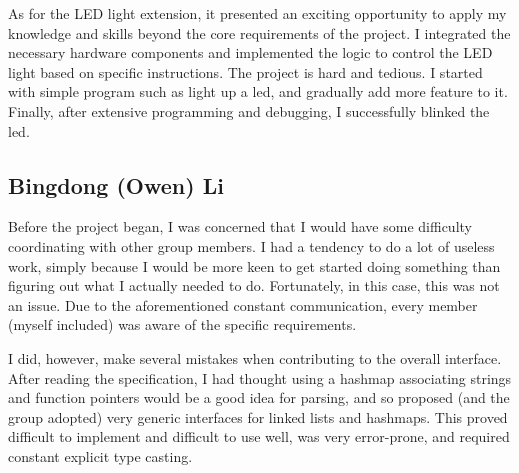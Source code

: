 \documentclass[11pt]{article}
\begin{document}
As for the LED light extension, it presented an exciting opportunity to apply my knowledge and skills beyond the core requirements of the project. I integrated the necessary hardware components and implemented the logic to control the LED light based on specific instructions. The project is hard and tedious. I started with simple program such as light up a led, and gradually add more feature to it. Finally, after extensive programming and debugging, I successfully blinked the led.

\subsection{Bingdong (Owen) Li}

Before the project began, I was concerned that I would have some difficulty coordinating with other group members. I had a tendency to do a lot of useless work, simply because I would be more keen to get started doing something than figuring out what I actually needed to do. Fortunately, in this case, this was not an issue. Due to the aforementioned constant communication, every member (myself included) was aware of the specific requirements.

I did, however, make several mistakes when contributing to the overall interface. After reading the specification, I had thought using a hashmap associating strings and function pointers would be a good idea for parsing, and so proposed (and the group adopted) very generic interfaces for linked lists and hashmaps. This proved difficult to implement and difficult to use well, was very error-prone, and required constant explicit type casting.
\end{document}
